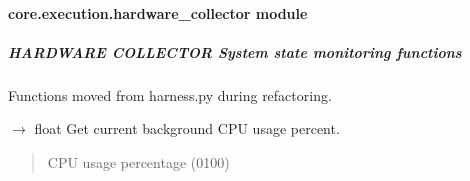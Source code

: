 \documentclass[letterpaper,10pt,english]{sphinxmanual}
\begin{document}
\begin{fulllineitems}
\begin{fulllineitems}
\end{fulllineitems}


\end{fulllineitems}


\sphinxstepscope


\paragraph{core.execution.hardware\_collector module}
\label{\detokenize{core.execution.hardware_collector:module-core.execution.hardware_collector}}\label{\detokenize{core.execution.hardware_collector:core-execution-hardware-collector-module}}\label{\detokenize{core.execution.hardware_collector::doc}}

\subparagraph{HARDWARE COLLECTOR \textendash{} System state monitoring functions}
\label{\detokenize{core.execution.hardware_collector:hardware-collector-system-state-monitoring-functions}}
\sphinxAtStartPar
Functions moved from harness.py during refactoring.

\begin{fulllineitems}
\label{\detokenize{core.execution.hardware_collector:core.execution.hardware_collector.get_background_cpu}}
\pysigstartsignatures
\pysiglinewithargsret
{}
{}
{{ $\rightarrow$ float}}
\pysigstopsignatures
\sphinxAtStartPar
Get current background CPU usage percent.
\begin{quote}\begin{description}
\sphinxAtStartPar
CPU usage percentage (0\sphinxhyphen{}100)

\end{description}\end{quote}

\end{fulllineitems}

\end{document}
